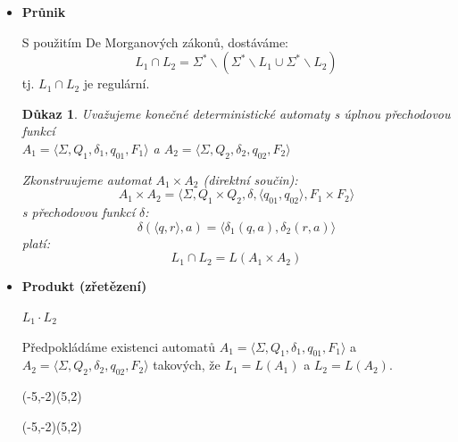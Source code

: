\documentclass[10pt, a4paper, titlepage]{article}
\theoremstyle{note}
\newtheorem{dukaz}{Důkaz}
\newtheorem{priklad}{Příklad}
\newcommand{\aut}[1]{$A_#1= \langle \Sigma,Q_#1,\delta_#1,q_{0#1},F_#1 \rangle$}
\begin{document}
\begin{itemize}
\begin{priklad}
První automat přijímá řetězec $ab$, druhý automat přijímá řetězec $ba$, čili od jejich sjednocení očekáváme, že bude přijímat $ab$ i $ba$. Jelikož množiny stavů nejsou disjunktní ($q_1$ je společný pro oba), sjednocení těchto automatů může stejně dobře přijímat i řetězce $aa$ nebo $bb$, což je nežádoucí.
\end{priklad}

\item
\textbf{Průnik} 

S použitím De Morganových zákonů, dostáváme:
$$L_1 \cap L_2 = \Sigma^* \backslash (\Sigma^* \backslash L_1 \cup \Sigma^* \backslash L_2 )$$
tj. $L_1 \cap L_2$ je regulární.

\begin{dukaz}
Uvažujeme konečné deterministické automaty s úplnou přechodovou funkcí\\
\aut{1} a \aut{2}

Zkonstruujeme automat $A_1 \times A_2$ (direktní součin):
$$A_1 \times A_2 = \langle \Sigma,Q_1 \times Q_2,\delta, \langle q_{01},q_{02} \rangle,F_1 \times F_2 \rangle$$
s přechodovou funkcí $\delta$:
$$ \delta (\langle q,r \rangle , a) = \langle \delta_1 (q,a), \delta_2 (r,a) \rangle $$
platí:
$$L_1 \cap L_2 = L(A_1 \times A_2)$$
\end{dukaz}

\item
\textbf{Produkt (zřetězení)} 

$L_1 \cdot L_2$

Předpokládáme existenci automatů \aut{1} a \aut{2} takových, že $L_1 = L(A_1)$ a $L_2 = L(A_2) $.

\begin{center}
\begin{VCPicture}{(-5,-2)(5,2)}
\FixStateDiameter{3cm} 
\FixStateDiameter{0.3cm} 

\end{VCPicture}
\end{center}

\begin{center}
\begin{VCPicture}{(-5,-2)(5,2)}
\FixStateDiameter{3cm} 
\FixStateDiameter{0.3cm} 


\end{VCPicture}
\end{center}
\end{itemize}
\end{document}

